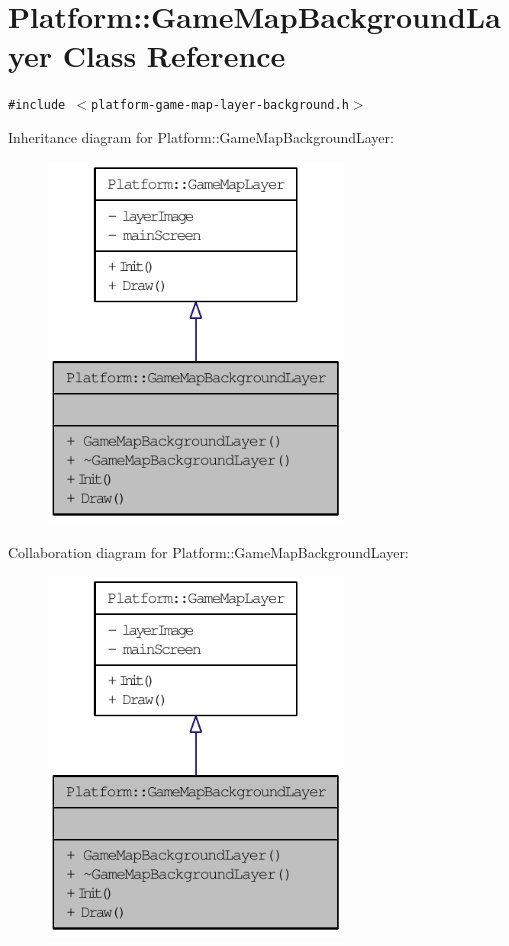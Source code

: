 \hypertarget{class_platform_1_1_game_map_background_layer}{
\section{Platform::GameMapBackgroundLayer Class Reference}
\label{df/d72/class_platform_1_1_game_map_background_layer}
}
{\tt \#include $<$platform-game-map-layer-background.h$>$}

Inheritance diagram for Platform::GameMapBackgroundLayer:\nopagebreak
\begin{figure}[H]
\begin{center}
\leavevmode
\includegraphics[width=222pt]{df/da2/class_platform_1_1_game_map_background_layer__inherit__graph}
\end{center}
\end{figure}
Collaboration diagram for Platform::GameMapBackgroundLayer:\nopagebreak
\begin{figure}[H]
\begin{center}
\leavevmode
\includegraphics[width=222pt]{d5/d7b/class_platform_1_1_game_map_background_layer__coll__graph}
\end{center}
\end{figure}
